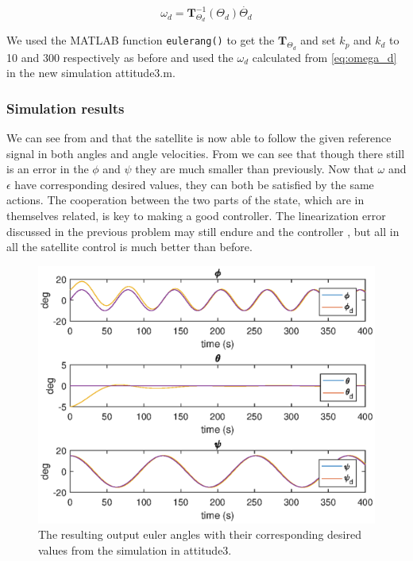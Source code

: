 \begin{equation}
    \omega_d = \mathbf{T}_{\Theta_d}^{-1}(\Theta_d)\dot{\Theta_d}
    \label{eq:omega_d}
\end{equation}

We used the MATLAB function \texttt{eulerang()} to get the $\mathbf{T}_{\Theta_d}$ and set $k_p$ and $k_d$ to 10 and 300 respectively as before and used the $\omega_d$ calculated from \eqref{eq:omega_d} in the new simulation {\color{blue} attitude3.m}.

\subsubsection*{Simulation results}

We can see from  and  that the satellite is now able to follow the given reference signal in both angles and angle velocities. From  we can see that though there still is an error in the $\phi$ and $\psi$ they are much smaller than previously. Now that $\omega$ and $\epsilon$ have corresponding desired values, they can both be satisfied by the same actions. The cooperation between the two parts of the state, which are in themselves related, is key to making a good controller. The linearization error discussed in the previous problem may still endure and the controller , but all in all the satellite control is much better than before.

\begin{figure}
	\centering
	\includegraphics[width=1.00\textwidth]{figures/3_euler.eps}
	\caption{The resulting output euler angles with their corresponding desired values from the simulation in attitude3.}
\label{fig:sim_attitude3_euler}
\end{figure}

